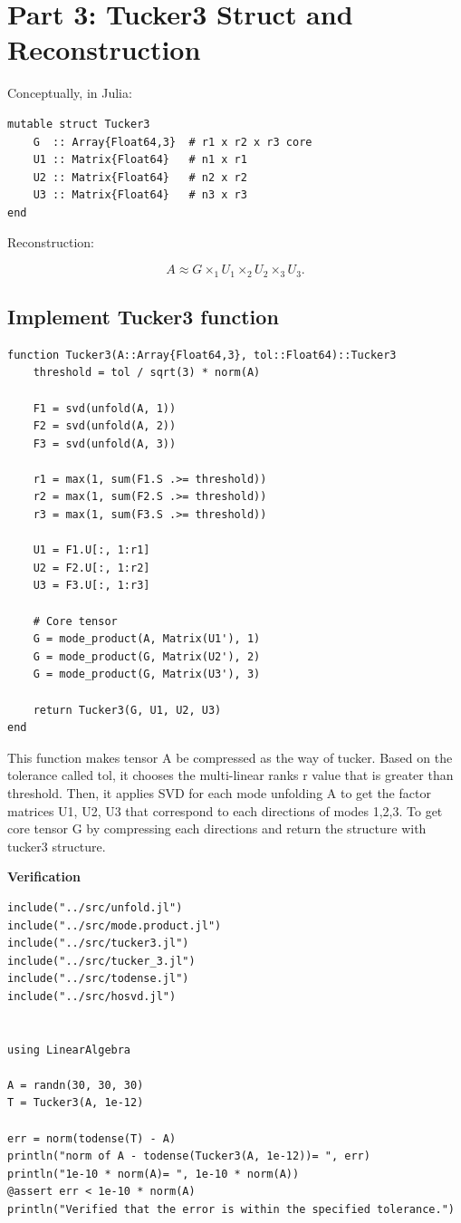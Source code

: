 \documentclass[11pt]{report}
\begin{document}
\section{Part 3: Tucker3 Struct and Reconstruction}

Conceptually, in Julia:
\begin{verbatim}
mutable struct Tucker3
    G  :: Array{Float64,3}  # r1 x r2 x r3 core
    U1 :: Matrix{Float64}   # n1 x r1
    U2 :: Matrix{Float64}   # n2 x r2
    U3 :: Matrix{Float64}   # n3 x r3
end
\end{verbatim}

Reconstruction:


\[
A \approx G \times_1 U_1 \times_2 U_2 \times_3 U_3.
\]

\subsection{Implement Tucker3 function}

\begin{lstlisting}
function Tucker3(A::Array{Float64,3}, tol::Float64)::Tucker3
    threshold = tol / sqrt(3) * norm(A)

    F1 = svd(unfold(A, 1))
    F2 = svd(unfold(A, 2))
    F3 = svd(unfold(A, 3))

    r1 = max(1, sum(F1.S .>= threshold))
    r2 = max(1, sum(F2.S .>= threshold))
    r3 = max(1, sum(F3.S .>= threshold))

    U1 = F1.U[:, 1:r1]
    U2 = F2.U[:, 1:r2]
    U3 = F3.U[:, 1:r3]

    # Core tensor
    G = mode_product(A, Matrix(U1'), 1)
    G = mode_product(G, Matrix(U2'), 2)
    G = mode_product(G, Matrix(U3'), 3)

    return Tucker3(G, U1, U2, U3)
end
\end{lstlisting}

This function makes tensor A be compressed as the way of tucker. Based on the tolerance called tol, it chooses the multi-linear ranks r value that is greater than threshold. Then, it applies SVD for each mode unfolding A to get the factor matrices U1, U2, U3 that correspond to each directions of modes 1,2,3. To get core tensor G by compressing each directions and return the structure with tucker3 structure. 

\textbf{Verification}

\begin{lstlisting}
include("../src/unfold.jl")
include("../src/mode.product.jl")
include("../src/tucker3.jl")
include("../src/tucker_3.jl")
include("../src/todense.jl")
include("../src/hosvd.jl")


using LinearAlgebra

A = randn(30, 30, 30)
T = Tucker3(A, 1e-12)

err = norm(todense(T) - A)
println("norm of A - todense(Tucker3(A, 1e-12))= ", err)
println("1e-10 * norm(A)= ", 1e-10 * norm(A))
@assert err < 1e-10 * norm(A)
println("Verified that the error is within the specified tolerance.")
\end{lstlisting}
\end{document}
